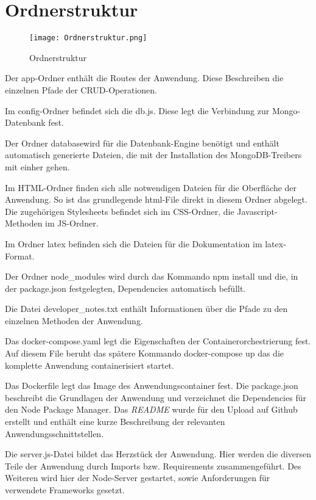 
\chapter{Ordnerstruktur}
\label{ch:Ordnerstruktur}
\begin{wrapfigure}{r}{.35\textwidth}
\centering
\texttt{[image: Ordnerstruktur.png]}
\vspace{1pt}
\caption{Ordnerstruktur}
\label{fig:Ordnerstruktur}
\end{wrapfigure}

Der app-Ordner enthält die Routes der Anwendung. Diese Beschreiben die einzelnen Pfade der \acs{CRUD}-Operationen.

Im config-Ordner befindet sich die \glqq db.js\grqq{}. Diese legt die Verbindung zur Mongo-Datenbank fest.

Der Ordner \glqq database\grqq{}wird für die Datenbank-Engine benötigt und enthält automatisch generierte Dateien, die mit der Installation des MongoDB-Treibers mit einher gehen.

Im \glqq \acs{HTML}\grqq{}-Ordner finden sich alle notwendigen Dateien für die Oberfläche der Anwendung. So ist das grundlegende html-File direkt in diesem Ordner abgelegt. Die zugehörigen Stylesheets befindet sich im \glqq \acs{CSS}\grqq{}-Ordner, die Javascript-Methoden im \acs{JS}-Ordner.

Im Ordner latex befinden sich die Dateien für die Dokumentation im latex-Format.

Der Ordner node\_modules wird durch das Kommando \glqq  npm install\grqq{} und die, in der package.json festgelegten, Dependencies automatisch befüllt.

Die Datei \glqq  developer\_notes.txt \grqq{} enthält Informationen über die Pfade zu den einzelnen Methoden der Anwendung.

Das \glqq docker-compose.yaml\grqq{} legt die Eigenschaften der Containerorchestrierung fest. Auf diesem File beruht das spätere Kommando \glqq  docker-compose up\grqq{} das die komplette Anwendung containerisiert startet.

Das Dockerfile legt das Image des Anwendungscontainer fest.
Die \glqq package.json\grqq{} beschreibt die Grundlagen der Anwendung und verzeichnet die Dependencies für den Node Package Manager.
Das \textit{README} wurde für den Upload auf Github erstellt und enthält eine kurze Beschreibung der relevanten Anwendungsschnittstellen.

Die \glqq server.js\grqq{}-Datei bildet das Herzstück der Anwendung. Hier werden die diversen Teile der Anwendung durch Imports bzw. Requirements zusammengeführt. Des Weiteren wird hier der Node-Server gestartet, sowie Anforderungen für verwendete Frameworks gesetzt.